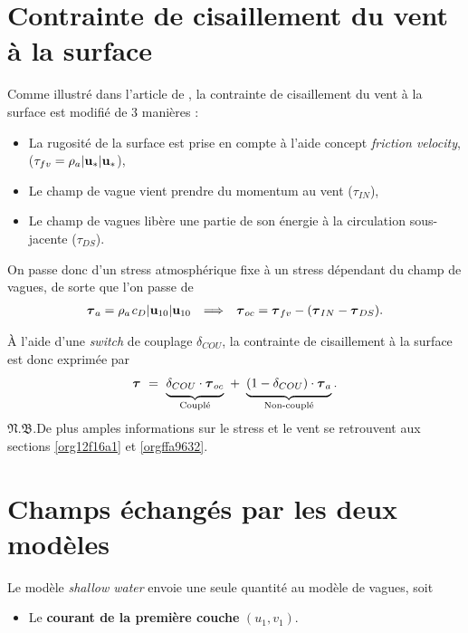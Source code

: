\documentclass[10pt]{report}
\numberwithin{equation}{section}
\newcommand{\uu}{\vb{u}}
\newcommand{\tall}{\vphantom{pA^{x^x}_p}}
\newcommand{\pt}{\hspace{1pt}} %
\newcommand{\nb}{\underline{{\footnotesize\EightStarConvex}\pt $\mathfrak{N.B.}$\vphantom{p}}\hspace{3pt}}
\begin{document}
\section{Contrainte de cisaillement du vent à la surface}
\label{sec:orgc322b01}
\label{orgbc29e26}

Comme illustré dans l'article de \Textcite{breivik_al_2015}, la contrainte de cisaillement du vent à la surface est modifié de 3 manières :
\begin{itemize}
\item La rugosité de la surface est prise en compte à l'aide concept \emph{friction velocity}, (\(\tau_{fv} = \rho_a |\uu_*| \uu_*\)),
\item Le champ de vague vient prendre du momentum au vent (\(\tau_{IN}\)),
\item Le champ de vagues libère une partie de son énergie à la circulation sous-jacente (\(\tau_{DS}\)).
\end{itemize}

On passe donc d'un stress atmosphérique fixe à un stress dépendant du champ de vagues, de sorte que l'on passe de 
\begin{align}
   && \boldsymbol{\tau}_a = \rho_a\pt c_D \abs{\uu_{10}}\uu_{10} && \Longrightarrow && \boldsymbol{\tau}_{oc} = \boldsymbol{\tau}_{fv} - (\boldsymbol{\tau}_{IN} - \boldsymbol{\tau}_{DS}). &&
\end{align}

À l'aide d'une \emph{switch} de couplage \(\delta_{COU}\), la contrainte de cisaillement à la surface est donc exprimée par
\begin{equation}
   \boldsymbol{\tau}\ =\ \underbrace{\tall\delta_{COU}\cdot\boldsymbol{\tau}_{oc}}_\text{Couplé}\ + \ \underbrace{(1-\delta_{COU}) \cdot \boldsymbol{\tau}_a\tall}_\text{Non-couplé}.
\end{equation}
\nb De plus amples informations sur le stress et le vent se retrouvent aux sections \ref{org12f16a1} et \ref{orgffa9632}.

\section{Champs échangés par les deux modèles}
\label{sec:org80cb7d5}

Le modèle \emph{shallow water} envoie une seule quantité au modèle de vagues, soit
\begin{itemize}
\item Le \textbf{courant de la première couche} \((u_1,v_1)\).\bigskip
\end{itemize}
\end{document}
